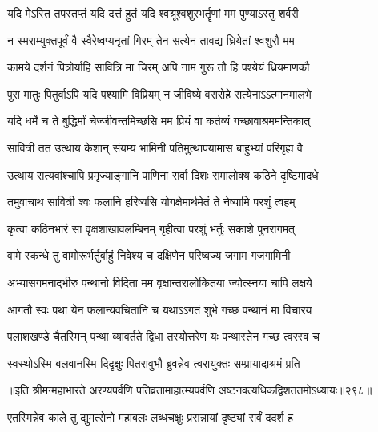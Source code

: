 \begin{center}
\twolineshloka
{यदि मेऽस्ति तपस्तप्तं यदि दत्तं हुतं यदि}
{श्वश्रूश्वशुरभर्तॄणां मम पुण्याऽस्तु शर्वरी}

\twolineshloka
{न स्मराम्युक्तपूर्वं वै स्वैरेष्वप्यनृतां गिरम्}
{तेन सत्येन तावद्य ध्रियेतां श्वशुरौ मम}


\twolineshloka
{कामये दर्शनं पित्रोर्याहि सावित्रि मा चिरम्}
{अपि नाम गुरू तौ हि  पश्येयं ध्रियमाणकौ}

\twolineshloka
{पुरा मातुः पितुर्वाऽपि यदि पश्यामि विप्रियम्}
{न जीविष्ये वरारोहे सत्येनाऽऽत्मानमालभे}

\twolineshloka
{यदि धर्मे च ते बुद्धिर्मां चेज्जीवन्तमिच्छसि}
{मम प्रियं वा कर्तव्यं गच्छावाश्रममन्तिकात्}


\twolineshloka
{सावित्री तत उत्थाय केशान् संयम्य भामिनी}
{पतिमुत्थापयामास बाहुभ्यां परिगृह्य वै}

\twolineshloka
{उत्थाय सत्यवांश्चापि प्रमृज्याङ्गानि पाणिना}
{सर्वा दिशः समालोक्य कठिने दृष्टिमादधे}

\twolineshloka
{तमुवाचाथ सावित्री श्वः फलानि हरिष्यसि}
{योगक्षेमार्थमेतं ते नेष्यामि परशुं त्वहम्}

\twolineshloka
{कृत्वा कठिनभारं सा वृक्षशाखावलम्बिनम्}
{गृहीत्वा परशुं भर्तुः सकाशे पुनरागमत्}

\twolineshloka
{वामे स्कन्धे तु वामोरूर्भर्तुर्बाहुं निवेश्य च}
{दक्षिणेन परिष्वज्य जगाम गजगामिनी}


\twolineshloka
{अभ्यासगमनाद्भीरु पन्थानो विदिता मम}
{वृक्षान्तरालोकितया ज्योत्स्नया चापि लक्षये}

\twolineshloka
{आगतौ स्वः पथा येन फलान्यवचितानि च}
{यथाऽऽगतं शुभे गच्छ पन्थानं मा विचारय}

\twolineshloka
{पलाशखण्डे चैतस्मिन् पन्था व्यावर्तते द्विधा}
{तस्योत्तरेण यः पन्थास्तेन गच्छ त्वरस्व च}

\twolineshloka
{स्वस्थोऽस्मि बलवानस्मि दिदृक्षुः पितरावुभौ}
{ब्रुवन्नेव त्वरायुक्तः सम्प्रायादाश्रमं प्रति}

॥इति श्रीमन्महाभारते अरण्यपर्वणि पतिव्रतामाहात्म्यपर्वणि अष्टनवत्यधिकद्विशततमोऽध्यायः॥२९८॥

\resetShloka


\twolineshloka
{एतस्मिन्नेव काले तु द्युमत्सेनो महाबलः}
{लब्धचक्षुः प्रसन्नायां दृष्ट्यां सर्वं ददर्श ह}


\end{center}
